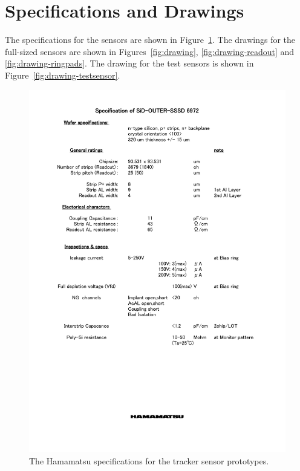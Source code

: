 \documentclass[prc,12pt,nofootinbib,letterpaper]{revtex4}
\begin{document}
\appendix

\section{Specifications and Drawings}
\label{sec:specs_drawings}

The specifications for the sensors are shown in Figure~\ref{fig:specs}.  The drawings for the full-sized sensors are shown in Figures~\ref{fig:drawing}, \ref{fig:drawing-readout} and \ref{fig:drawing-ringpads}.   The drawing for the test sensors is shown in Figure~\ref{fig:drawing-testsensor}.
\begin{figure}[p]
\begin{center}
    \includegraphics[width=6in]{figures/SiD specsheet 071214}
\caption{The Hamamatsu specifications for the tracker sensor prototypes.}
\label{fig:specs}
\end{center}
\end{figure}
\end{document}
